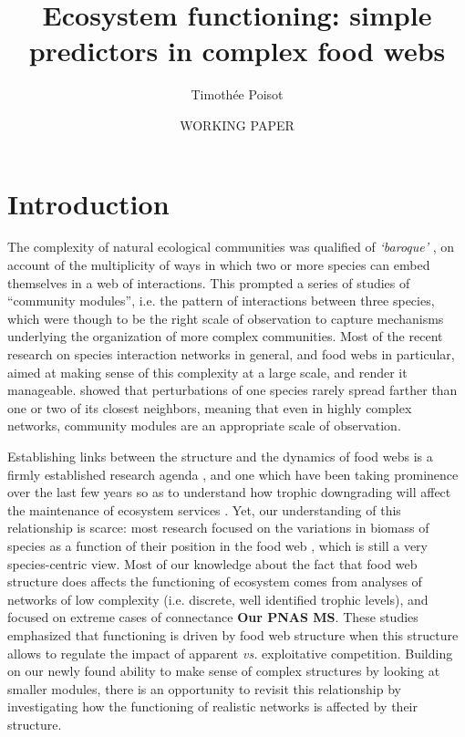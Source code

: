 \documentclass[12pt]{article}
\title{Ecosystem functioning: simple predictors in complex food webs}
\author{Timoth\'ee Poisot}
\date{WORKING PAPER}
\begin{document}
\maketitle\doublespacing

\section{Introduction}

The complexity of natural ecological communities was qualified of
\emph{`baroque'} \parencite{Holt1997}, on account of the multiplicity of ways in
which two or more species can embed themselves in a web of interactions. This
prompted a series of studies of ``community modules'', i.e. the pattern of
interactions between three species, which were though to be the right scale of
observation to capture mechanisms underlying the organization of more complex
communities. Most of the recent research on species interaction networks in
general, and food webs in particular, aimed at making sense of this complexity
at a large scale, and render it manageable. \textcite{Berlow2009} showed that
perturbations of one species rarely spread farther than one or two of its
closest neighbors, meaning that even in highly complex networks, community
modules are an appropriate scale of observation.

Establishing links between the structure and the dynamics of food webs is a
firmly established research agenda \parencite{Pascual2006}, and one which have
been taking prominence over the last few years so as to understand how trophic
downgrading will affect the maintenance of ecosystem services
\parencite{Estes2011}. Yet, our understanding of this relationship is scarce:
most research focused on the variations in biomass of species as a function of
their position in the food web \parencite{Williams2007,Berlow2009}, which is
still a very species-centric view. Most of our knowledge about the fact that
food web structure does affects the functioning of ecosystem comes from analyses
of networks of low complexity (i.e. discrete, well identified trophic levels),
and focused on extreme cases of connectance
\parencite[e.g.][]{Thebault2003,Thebault2007} \textbf{Our PNAS MS}. These
studies emphasized that functioning is driven by food web structure when this
structure allows to regulate the impact of apparent \emph{vs.} exploitative
competition. Building on our newly found ability to make sense of complex
structures by looking at smaller modules, there is an opportunity to revisit
this relationship by investigating how the functioning of realistic networks is
affected by their structure.
\end{document}

